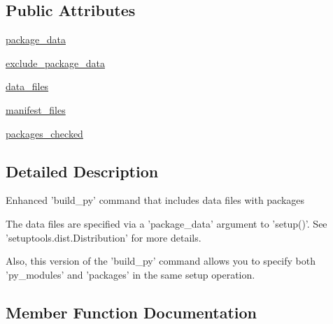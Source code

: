 \subsection*{Public Attributes}
\begin{DoxyCompactItemize}
\item 
\hyperlink{classsetuptools_1_1command_1_1build__py_1_1build__py_a8f8100423fe5e05b57219cc00bf02568}{package\+\_\+data}
\item 
\hyperlink{classsetuptools_1_1command_1_1build__py_1_1build__py_a33b6b204c8d3b70c09bbe86665dc15ec}{exclude\+\_\+package\+\_\+data}
\item 
\hyperlink{classsetuptools_1_1command_1_1build__py_1_1build__py_ac7bbc5fa976c30801af286a2321a063d}{data\+\_\+files}
\item 
\hyperlink{classsetuptools_1_1command_1_1build__py_1_1build__py_a66ea87dce6b5b5419f1558828bb92080}{manifest\+\_\+files}
\item 
\hyperlink{classsetuptools_1_1command_1_1build__py_1_1build__py_a748973ff26b6980cef5282fa66c3ba38}{packages\+\_\+checked}
\end{DoxyCompactItemize}


\subsection{Detailed Description}
\begin{DoxyVerb}Enhanced 'build_py' command that includes data files with packages

The data files are specified via a 'package_data' argument to 'setup()'.
See 'setuptools.dist.Distribution' for more details.

Also, this version of the 'build_py' command allows you to specify both
'py_modules' and 'packages' in the same setup operation.
\end{DoxyVerb}
 

\subsection{Member Function Documentation}
\hypertarget{classsetuptools_1_1command_1_1build__py_1_1build__py_aa9ce4106c069881085058ff8b2c9efdc}{}
